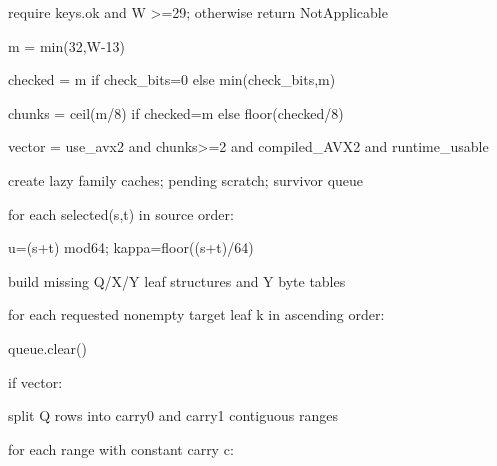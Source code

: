 \documentclass[10pt,letterpaper]{article}
\begin{document}
{\scriptsize\ttfamily\raggedright

\noindent\hspace*{0em}require keys.ok and W >=29; otherwise return NotApplicable\par

\noindent\hspace*{0em}m = min(32,W-13)\par

\noindent\hspace*{0em}checked = m if check\_bits=0 else min(check\_bits,m)\par

\noindent\hspace*{0em}chunks = ceil(m/8) if checked=m else floor(checked/8)\par

\noindent\hspace*{0em}vector = use\_avx2 and chunks>=2 and compiled\_AVX2 and runtime\_usable\par

\noindent\hspace*{0em}create lazy family caches; pending scratch; survivor queue\par

\noindent\hspace*{0em}for each selected(s,t) in source order:\par

\noindent\hspace*{4em}u=(s+t) mod64; kappa=floor((s+t)/64)\par

\noindent\hspace*{4em}build missing Q/X/Y leaf structures and Y byte tables\par

\noindent\hspace*{4em}for each requested nonempty target leaf k in ascending order:\par

\noindent\hspace*{8em}queue.clear()\par

\noindent\hspace*{8em}if vector:\par

\noindent\hspace*{12em}split Q rows into carry0 and carry1 contiguous ranges\par

\noindent\hspace*{12em}for each range with constant carry c:\par

}
\end{document}

